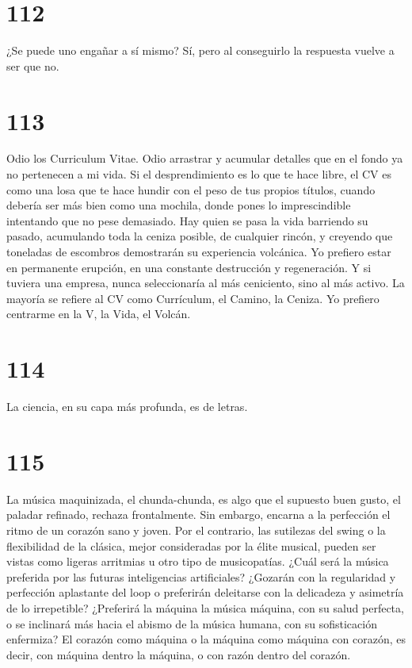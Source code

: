 \documentclass[a4paper,11pt,openright,twocolumn]{book}
\begin{document}
\section*{112}

¿Se puede uno engañar a sí mismo? Sí, pero al conseguirlo la respuesta vuelve a ser que no. 


\section*{113}

Odio los Curriculum Vitae. Odio arrastrar y acumular detalles que en el fondo ya no pertenecen a mi vida.
Si el desprendimiento es lo que te hace libre, el CV es como una losa que te hace hundir con el peso de tus
propios títulos, cuando debería ser más bien como una mochila, donde pones lo imprescindible intentando
que no pese demasiado. Hay quien se pasa la vida barriendo su pasado, acumulando toda la ceniza posible,
de cualquier rincón, y 
creyendo que toneladas de escombros demostrarán su experiencia volcánica.
Yo prefiero estar en permanente erupción, en una constante destrucción y regeneración. Y si tuviera una
empresa, nunca seleccionaría al más ceniciento, sino al más activo. La mayoría se refiere al CV como Currículum,
el Camino, la Ceniza. Yo prefiero centrarme en la V, la Vida, el Volcán.  

\section*{114}

La ciencia, en su capa más profunda, es de letras.

\section*{115}

La música maquinizada, el chunda-chunda, es algo que el supuesto buen gusto, el paladar refinado, rechaza
frontalmente. Sin embargo, encarna a la perfección el ritmo de un corazón sano y joven. Por el 
contrario, las sutilezas del swing o la flexibilidad de la clásica, mejor consideradas por la élite musical,
pueden ser vistas como ligeras arritmias u otro tipo de musicopatías. ¿Cuál será la música preferida por las futuras
inteligencias artificiales? ¿Gozarán con la regularidad y perfección aplastante del loop o preferirán deleitarse
con la delicadeza y asimetría de lo irrepetible? ¿Preferirá la máquina la música máquina, con su salud perfecta, o 
se inclinará más hacia el abismo de la música humana, con su sofisticación enfermiza? El corazón como máquina
o la máquina como máquina con corazón, es decir, con máquina dentro la máquina, o con razón dentro del corazón. 
\end{document}
